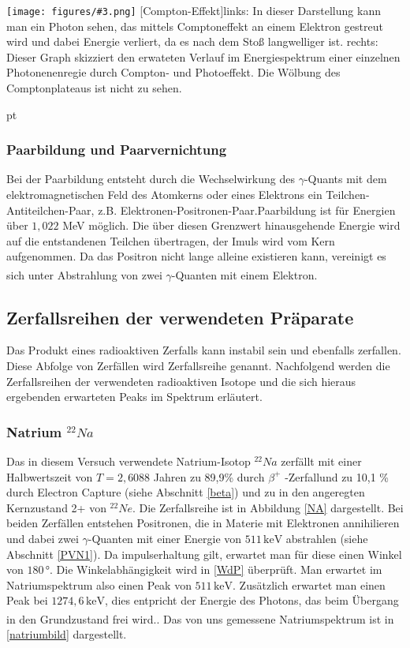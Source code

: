 \documentclass[12pt,listof=totoc]{scrartcl}
\newcommand{\graShort}[4][0.7]{
	\begin{minipage}[h!]{\textwidth}
		\centering
		\texttt{[image: figures/\#3.png]}
		\captionof{figure}[#2]{#4}
	\end{minipage}
	\vskip 30 pt
}
\begin{document}
 \graShort{Compton-Effekt}{Compton}{links: In dieser Darstellung kann man ein Photon sehen, das mittels Comptoneffekt an einem Elektron gestreut wird und dabei Energie verliert, da es nach dem Stoß langwelliger ist.\cite{staat} rechts: Dieser Graph skizziert den erwateten Verlauf im Energiespektrum einer einzelnen
 Photonenenregie durch Compton- und Photoeffekt. Die Wölbung des Comptonplateaus ist nicht zu
 sehen.\cite{med}}
 \subsubsection{Paarbildung und Paarvernichtung \label{PVN1}}
 Bei der Paarbildung entsteht durch die Wechselwirkung des $\gamma$-Quants mit dem elektromagnetischen Feld des Atomkerns oder eines Elektrons ein Teilchen-Antiteilchen-Paar, z.B. Elektronen-Positronen-Paar.Paarbildung ist für Energien über $1,022$ MeV möglich. Die über diesen Grenzwert hinausgehende Energie wird auf die entstandenen Teilchen übertragen, der Imuls wird vom Kern aufgenommen. Da das Positron nicht lange alleine existieren kann, vereinigt es sich unter Abstrahlung von zwei $\gamma$-Quanten mit einem Elektron.\textsuperscript{\cite{anleitung}}
 
 \subsection{Zerfallsreihen der verwendeten Präparate \label{ZR}}
 
 Das Produkt eines radioaktiven Zerfalls kann instabil sein und ebenfalls zerfallen. Diese
 Abfolge von Zerfällen wird Zerfallsreihe genannt. Nachfolgend werden die Zerfallsreihen der verwendeten radioaktiven Isotope und die sich hieraus ergebenden erwarteten Peaks im Spektrum erläutert.
 
 \subsubsection{Natrium $^{22}Na$}
 Das in diesem Versuch verwendete Natrium-Isotop $^{22}Na$ zerfällt mit einer Halbwertszeit von $T=2,6088$ Jahren zu  89,9\% durch $\beta^+$ -Zerfallund zu  10,1 \% durch Electron Capture (siehe Abschnitt \ref{beta}) und zu  in den angeregten Kernzustand 2+ von $^{22}Ne$. Die Zerfallsreihe ist in Abbildung \ref{NA} dargestellt. Bei beiden Zerfällen entstehen Positronen, die in Materie mit Elektronen annihilieren und dabei zwei $\gamma$-Quanten mit einer Energie von $511\,\mathrm{keV}$ abstrahlen (siehe Abschnitt \ref{PVN1}). Da impulserhaltung gilt, erwartet man für diese einen Winkel von $180\,\mathrm{°}$. Die Winkelabhängigkeit wird in \ref{WdP} überprüft. Man erwartet im Natriumspektrum also einen Peak von $511\,\mathrm{keV}$. Zusätzlich erwartet man einen Peak bei $1274,6\,\mathrm{keV}$, dies entpricht der Energie des Photons, das beim Übergang in den Grundzustand frei wird.\textsuperscript{\cite{staat}}. Das von uns gemessene Natriumspektrum ist in \ref{natriumbild} dargestellt.
 
\end{document}
